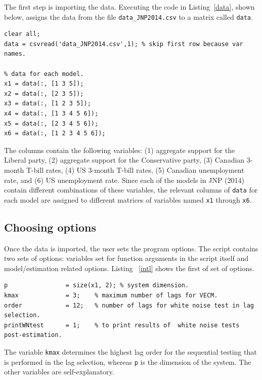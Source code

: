 \documentclass[10pt]{article}
\begin{document}
The first step is importing the data. Executing the code in Listing~\ref{data}, shown below, assigns the data from the file \verb|data_JNP2014.csv| to a matrix called \verb|data|. 

\lstset{firstnumber=last}
\begin{lstlisting}[frame=single,caption={Importing data}, label = data]
% -------- Import Data ----------%
clear all;
data = csvread('data_JNP2014.csv',1); % skip first row because var names.

% data for each model.
x1 = data(:, [1 3 5]);
x2 = data(:, [2 3 5]);
x3 = data(:, [1 2 3 5]);
x4 = data(:, [1 3 4 5 6]);
x5 = data(:, [2 3 4 5 6]);
x6 = data(:, [1 2 3 4 5 6]);
\end{lstlisting}

The columns contain the following variables: (1) aggregate support for the Liberal party, (2) aggregate support for the Conservative party, (3) Canadian 3-month T-bill rates, (4) US 3-month T-bill rates, (5) Canadian unemployment rate, and (6) US unemployment rate. Since each of the models in JNP (2014) contain different combinations of these variables, the relevant columns of \verb|data| for each model are assigned to different matrices of variables named \verb|x1| through \verb|x6|.

\subsection{Choosing options}
\label{subsec choosing options}

Once the data is imported, the user sets the program options. The script contains two sets of options: variables set for function arguments in the script itself and model/estimation related options. Listing ~\ref{intl} shows the first of set of options. 
\begin{lstlisting}[frame=single,caption={Initialization of local variables}, label = intl]
%% -------- INITIALIZATION ----------%
p                = size(x1, 2); % system dimension.
kmax             = 3;    % maximum number of lags for VECM.
order            = 12;   % number of lags for white noise test in lag selection.
printWNtest      = 1;    % to print results of  white noise tests post-estimation.
\end{lstlisting}

The variable \verb|kmax| determines the highest lag order for the sequential testing that is performed in the lag selection, whereas \verb|p| is the dimension of the system. The other variables are self-explanatory.
\end{document}
